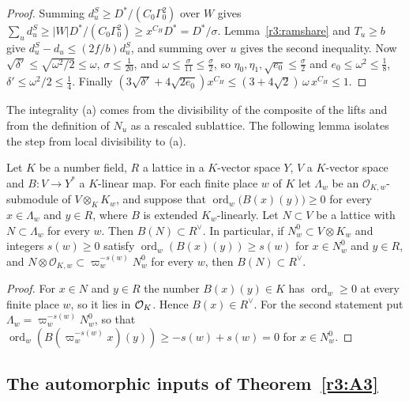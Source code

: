 \begin{proof}
Summing $d^S_u\ge D^*/(C_0\Gamma_0^2)$ over $W$ gives $\sum_ud^S_u\ge\lvert W\rvert D^*/(C_0\Gamma_0^2)\ge x^{C_H}D^*=D^*/\sigma$. Lemma~\ref{r3:ramshare} and $T_u\ge b$ give $d^S_u-d_u\le(2f/b)d^S_u$, and summing over $u$ gives the second inequality. Now $\sqrt{\delta'}\le\sqrt{\omega^2/2}\le\omega$, $\sigma\le\frac1{20}$, and $\omega\le\frac{\sigma}{11}\le\frac\sigma2$, so $\eta_0,\eta_1,\sqrt{e_0}\le\frac\sigma2$ and $e_0\le\omega^2\le\frac18$, $\delta'\le\omega^2/2\le\frac14$. Finally $(3\sqrt{\delta'}+4\sqrt{2e_0})x^{C_H}\le(3+4\sqrt2)\,\omega\,x^{C_H}\le1$.
\end{proof}

The integrality (a) comes from the divisibility of the composite of the lifts and from the definition of $N_u$ as a rescaled sublattice. The following lemma isolates the step from local divisibility to (a).

\begin{lemma}\label{r3:int}
Let $K$ be a number field, $R$ a lattice in a $K$-vector space $Y$, $V$ a $K$-vector space and $B\colon V\to Y^*$ a $K$-linear map. For each finite place $w$ of $K$ let $\Lambda_w$ be an $\mathcal O_{K,w}$-submodule of $V\otimes_KK_w$, and suppose that $\operatorname{ord}_w\big(B(x)(y)\big)\ge0$ for every $x\in\Lambda_w$ and $y\in R$, where $B$ is extended $K_w$-linearly. Let $N\subset V$ be a lattice with $N\subset\Lambda_w$ for every $w$. Then $B(N)\subset R^\vee$. In particular, if $N^0_w\subset V\otimes K_w$ and integers $s(w)\ge0$ satisfy $\operatorname{ord}_w(B(x)(y))\ge s(w)$ for $x\in N^0_w$ and $y\in R$, and $N\otimes\mathcal O_{K,w}\subset\varpi_w^{-s(w)}N^0_w$ for every $w$, then $B(N)\subset R^\vee$.
\end{lemma}

\begin{proof}
For $x\in N$ and $y\in R$ the number $B(x)(y)\in K$ has $\operatorname{ord}_w\ge0$ at every finite place $w$, so it lies in $\mathcal O_K$. Hence $B(x)\in R^\vee$. For the second statement put $\Lambda_w=\varpi_w^{-s(w)}N^0_w$, so that $\operatorname{ord}_w(B(\varpi_w^{-s(w)}x)(y))\ge-s(w)+s(w)=0$ for $x\in N^0_w$.
\end{proof}

\subsection{The automorphic inputs of Theorem~\ref{r3:A3}}\label{r3:sec:S}

